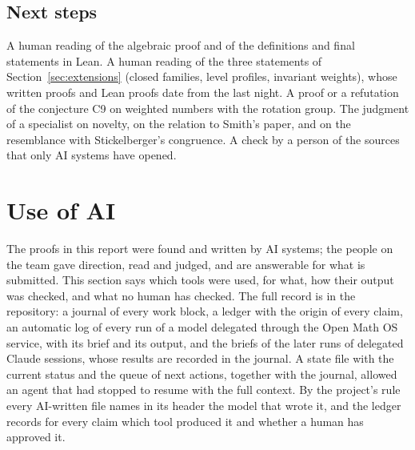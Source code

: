 \documentclass[11pt]{article}
\theoremstyle{definition}
\theoremstyle{remark}
\numberwithin{equation}{section}
\numberwithin{figure}{section}
\begin{document}
\subsection{Next steps}
A human reading of the algebraic proof and of the definitions and final statements in Lean. A human reading of
the three statements of Section~\ref{sec:extensions} (closed families, level profiles, invariant weights),
whose written proofs and Lean proofs date from the last night. A proof or a refutation of the conjecture C9
on weighted numbers with the rotation group. The judgment of a specialist on novelty, on the relation to
Smith's paper, and on the resemblance with Stickelberger's congruence. A check by a person of the sources
that only AI systems have opened.

\section{Use of AI}\label{sec:ai}
The proofs in this report were found and written by AI systems; the people on the team gave direction, read
and judged, and are answerable for what is submitted. This section says which tools were used, for what, how
their output was checked, and what no human has checked. The full record is in the repository: a journal of
every work block, a ledger with the origin of every claim, an automatic log of every run of a model
delegated through the Open Math OS service, with its brief and its output, and the briefs of the later runs
of delegated Claude sessions, whose results are recorded in the journal. A state file with the current status
and the queue of next actions, together with the journal, allowed an agent that had stopped to resume with the
full context. By the project's rule every AI-written file names in its header the model that wrote it, and the
ledger records for every claim which tool produced it and whether a human has approved it.
\end{document}
